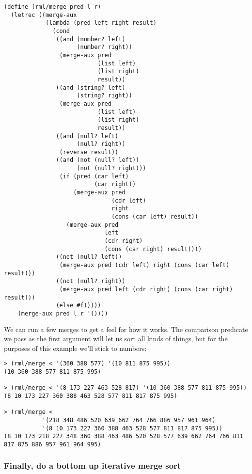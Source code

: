 \documentclass[12pt,openright,draft]{book}
\begin{document}
\begin{verbatim}
(define (rml/merge pred l r)
  (letrec ((merge-aux
            (lambda (pred left right result)
              (cond
               ((and (number? left)
                     (number? right))
                (merge-aux pred
                           (list left)
                           (list right)
                           result))
               ((and (string? left)
                     (string? right))
                (merge-aux pred
                           (list left)
                           (list right)
                           result))
               ((and (null? left)
                     (null? right))
                (reverse result))
               ((and (not (null? left))
                     (not (null? right)))
                (if (pred (car left)
                          (car right))
                    (merge-aux pred
                               (cdr left)
                               right
                               (cons (car left) result))
                  (merge-aux pred
                             left
                             (cdr right)
                             (cons (car right) result))))
               ((not (null? left))
                (merge-aux pred (cdr left) right (cons (car left) result)))
               ((not (null? right))
                (merge-aux pred left (cdr right) (cons (car right) result)))
               (else #f)))))
    (merge-aux pred l r '())))
\end{verbatim}

We can run a few merges to get a feel for how it works. The comparison
predicate we pass as the first argument will let us sort all kinds of
things, but for the purposes of this example we'll stick to numbers:

\begin{verbatim}
> (rml/merge < '(360 388 577) '(10 811 875 995))
(10 360 388 577 811 875 995)

> (rml/merge < '(8 173 227 463 528 817) '(10 360 388 577 811 875 995))
(8 10 173 227 360 388 463 528 577 811 817 875 995)

> (rml/merge <
           '(218 348 486 520 639 662 764 766 886 957 961 964)
           '(8 10 173 227 360 388 463 528 577 811 817 875 995))
(8 10 173 218 227 348 360 388 463 486 520 528 577 639 662 764 766 811 817 875 886 957 961 964 995)
\end{verbatim}

\subsubsection{Finally, do a bottom up iterative merge sort}
\end{document}
